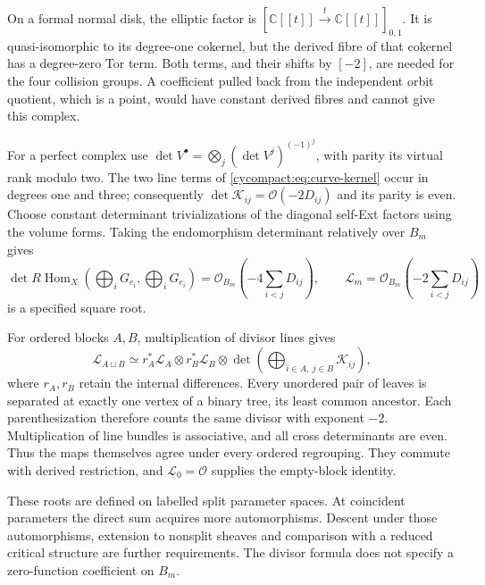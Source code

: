 On a formal normal disk, the elliptic factor is
$[\mathbb C[[t]]\xrightarrow{t}\mathbb C[[t]]]_{0,1}$.
It is quasi-isomorphic to its degree-one cokernel, but the
derived fibre of that cokernel has a degree-zero Tor term.
Both terms, and their shifts by $[-2]$, are needed for the
four collision groups. A coefficient pulled back from the
independent orbit quotient, which is a point, would have
constant derived fibres and cannot give this complex.

For a perfect complex use
$\det V^\bullet=\bigotimes_j(\det V^j)^{(-1)^j}$,
with parity its virtual rank modulo two. The two line
terms of \eqref{cycompact:eq:curve-kernel} occur in degrees
one and three; consequently
$\det\mathcal K_{ij}=\mathcal O(-2D_{ij})$ and its parity
is even. Choose constant determinant trivializations of the
diagonal self-Ext factors using the volume forms.
Taking the endomorphism determinant relatively over $B_m$ gives
\begin{equation}\label{cycompact:eq:curve-root}
 \det R\operatorname{Hom}_X
  \left(\bigoplus_iG_{e_i},\bigoplus_iG_{e_i}\right)
 =\mathcal O_{B_m}\left(-4\sum_{i<j}D_{ij}\right),\qquad
 \mathcal L_m=\mathcal O_{B_m}\left(-2\sum_{i<j}D_{ij}\right)
\end{equation}
is a specified square root.

For ordered blocks $A,B$, multiplication of divisor lines
gives
\begin{equation}\label{cycompact:eq:curve-root-sewing}
 \mathcal L_{A\sqcup B}\simeq
 r_A^*\mathcal L_A\otimes r_B^*\mathcal L_B\otimes
 \det\!\left(\bigoplus_{i\in A,\ j\in B}\mathcal K_{ij}\right),
\end{equation}
where $r_A,r_B$ retain the internal differences.
Every unordered pair of leaves is separated at exactly one
vertex of a binary tree, its least common ancestor. Each
parenthesization therefore counts the same divisor with
exponent $-2$. Multiplication of line bundles is associative,
and all cross determinants are even. Thus the maps themselves
agree under every ordered regrouping. They commute with
derived restriction, and $\mathcal L_0=\mathcal O$ supplies
the empty-block identity.

These roots are defined on labelled split parameter spaces.
At coincident parameters the direct sum acquires more
automorphisms. Descent under those automorphisms, extension
to nonsplit sheaves and comparison with a reduced critical
structure are further requirements. The divisor formula
does not specify a zero-function coefficient on $B_m$.

